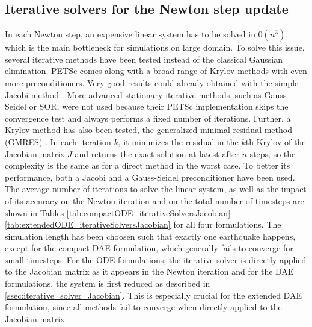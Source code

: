 \subsection{Iterative solvers for the Newton step update}
In each Newton step, an expensive linear system has to be solved in $\mathcal{0}\left(n^3\right)$, which is the main bottleneck for simulations on large domain. To solve this issue, several iterative methods have been tested  instead of the classical Gaussian elimination. PETSc comes along with a broad range of Krylov methods with even more preconditioners. Very good results could already obtained with the simple Jacobi method \cite[p. 230]{IterativeSolutionMethods}. More advanced stationary iterative methods, such as Gauss-Seidel or SOR, were not used because their PETSc implementation skips the convergence test and always performs a fixed number of iterations. Further, a Krylov method has also been tested, the generalized minimal residual method (GMRES) \cite{GMRES}. In each iteration $k$, it minimizes the residual in the $k$th-Krylov of the Jacobian matrix $J$ and returns the exact solution at latest after $n$ steps, so the complexity is the same as for a direct method in the worst case. To better its performance, both a Jacobi and a Gauss-Seidel preconditioner have been used. \\
The average number of iterations to solve the linear system, as well as the impact of its accuracy on the Newton iteration and on the total number of timesteps are shown in Tables \ref{tab:compactODE_iterativeSolversJacobian}-\ref{tab:extendedODE_iterativeSolversJacobian} for all four formulations. The simulation length has been choosen such that exactly one earthquake happens, except for the compact DAE formulation, which generally fails to converge for small timesteps. For the ODE formulations, the iterative solver is directly applied to the Jacobian matrix as it appears in the Newton iteration and for the DAE formulations, the system is first reduced as described in \autoref{ssec:iterative_solver_Jacobian}. This is especially crucial for the extended DAE formulation, since all methods fail to converge when directly applied to the Jacobian matrix. 

